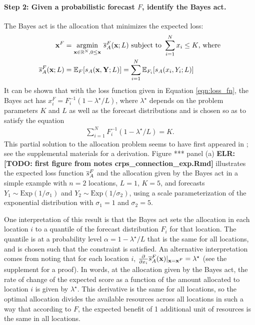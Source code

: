\documentclass{article}
\def\elr#1{{\color{cyan}\textbf{ELR:[#1]}}}
\begin{document}
\paragraph{Step 2: Given a probabilistic forecast $F$, identify the Bayes act.} The Bayes act is the allocation that minimizes the expected loss:
\begin{align}
    \mathbf{x}^F &= \underset{\mathbf{x}\in \mathbb{R}^N, 0 \leq \mathbf{x}}{\mathrm{arg min}}\,\, \overline{s}_A^F(\mathbf{x}; L) \text{ subject to } 
    \sum_{i=1}^N x_i \leq K \text{, where} \label{AP} \\
    \overline{s}_A^F(\mathbf{x}; L) &= \mathbb{E}_{F} [s_A(\mathbf{x}, \mathbf{Y}; L)] = \sum_{i=1}^{N} \mathbb{E}_{F_i}[s_A(x_i, Y_i; L)] \label{eqn:sbar}
\end{align}
It can be shown that with the loss function given in Equation \eqref{eqn:loss_fn}, the Bayes act has $x^F_i = F_i^{-1}(1 - \lambda^{\star}/L)$, where $\lambda^{\star}$ depends on the problem parameters $K$ and $L$ as well as the forecast distributions and is chosen so as to satisfy the equation
\begin{align}
\sum_{i=1}^{N}F_i^{-1}(1 - \lambda^{\star}/L) = K.
\end{align}
This partial solution to the allocation problem seems to have first appeared in \cite{hadleywhitin1963}; see the supplemental materials for a derivation. Figure *** panel (a) \elr{TODO: first figure from notes crps\_connection\_exp.Rmd} illustrates the expected loss function $\overline{s}_A^F$ and the allocation given by the Bayes act in a simple example with $n = 2$ locations, $L = 1$, $K = 5$, and forecasts $Y_1 \sim \text{Exp}(1 / \sigma_1)$ and $Y_2 \sim \text{Exp}(1 / \sigma_2)$, using a scale parameterization of the exponential distribution with $\sigma_1 = 1$ and $\sigma_2 = 5$.

One interpretation of this result is that the Bayes act sets the allocation in each location $i$ to a quantile of the forecast distribution $F_i$ for that location. The quantile is at a probability level $\alpha = 1 - \lambda^{\star}/L$ that is the same for all locations, and is chosen such that the constraint is satisfied. An alternative interpretation comes from noting that for each location $i$, $\frac{\partial}{\partial x_i} \overline{s}_A^F(\mathbf{x}) \vert_{\mathbf{x}=\mathbf{x}^F} = \lambda^{\star}$ (see the supplement for a proof).
In words, at the allocation given by the Bayes act, the rate of change of the expected score as a function of the amount allocated to location $i$ is given by $\lambda^{\star}$.
This derivative is the same for all locations, so the optimal allocation divides the available resources across all locations in such a way that according to $F$, the expected benefit of 1 additional unit of resources is the same in all locations.
\end{document}
